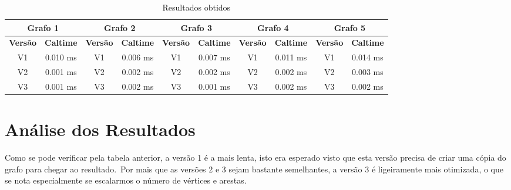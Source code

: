 \begin{table}[H]
    \centering
    \label{tab:resultados}
    \begin{tabular}{|c|c|c|c|c|c|c|c|c|c|}

        \hline
        \multicolumn{2}{|c|}{\textbf{Grafo 1}} & \multicolumn{2}{|c|}{\textbf{Grafo 2}} & \multicolumn{2}{|c|}{\textbf{Grafo 3}} & \multicolumn{2}{|c|}{\textbf{Grafo 4}} & \multicolumn{2}{|c|}{\textbf{Grafo 5}} \\
        \hline
        \textbf{Versão} & \textbf{Caltime} & \textbf{Versão} & \textbf{Caltime} & \textbf{Versão} & \textbf{Caltime} & \textbf{Versão} & \textbf{Caltime} & \textbf{Versão} & \textbf{Caltime} \\
        \hline
        V1 & 0.010 ms & V1 & 0.006 ms & V1 & 0.007 ms & V1 & 0.011 ms & V1 & 0.014 ms\\
        \hline
        V2 & 0.001 ms & V2 & 0.002 ms & V2 & 0.002 ms & V2 & 0.002 ms & V2 & 0.003 ms\\
        \hline
        V3 & 0.001 ms & V3 & 0.002 ms & V3 & 0.001 ms & V3 & 0.002 ms & V3 & 0.002 ms\\
        \hline

    \end{tabular}
    \caption{Resultados obtidos}
\end{table}

\section{Análise dos Resultados}
\label{sec:analise-experimental:analise-dos-resultados}

Como se pode verificar pela tabela anterior, a versão 1 é a mais lenta, isto era esperado visto que esta versão precisa de criar uma cópia do grafo para chegar ao resultado.\ Por mais que as versões 2 e 3 sejam bastante semelhantes, a versão 3 é ligeiramente mais otimizada, o que se nota especialmente se escalarmos o número de vértices e arestas.